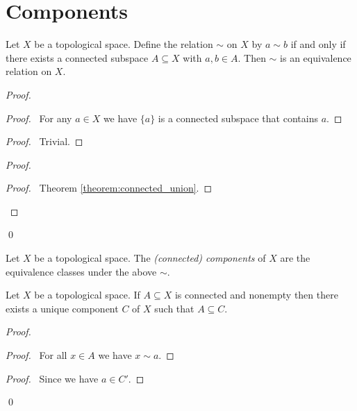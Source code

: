 \section{Components}

\begin{proposition}
    Let $X$ be a topological space. Define the relation $\sim$ on $X$ by
    $a \sim b$ if and only if there exists a connected subspace $A \subseteq X$
    with $a, b \in A$. Then $\sim$ is an equivalence relation on $X$.
\end{proposition}

\begin{proof}
    \pf
    \begin{proof}
        \pf\ For any $a \in X$ we have $\{a\}$ is a connected subspace that
        contains $a$.
    \end{proof}
    \begin{proof}
        \pf\ Trivial.
    \end{proof}
    \begin{proof}
        \begin{proof}
            \pf\ Theorem \ref{theorem:connected_union}.
        \end{proof}
    \end{proof}
    \qed
\end{proof}

\begin{definition}
    Let $X$ be a topological space. The \emph{(connected) components} of
    $X$ are the equivalence classes under the above $\sim$.
\end{definition}

\begin{lemma}
    \label{lemma:component_includes_connected}
    Let $X$ be a topological space. If $A \subseteq X$ is connected 
    and nonempty then there
    exists a unique component $C$ of $X$ such that $A \subseteq C$.
\end{lemma}

\begin{proof}
    \pf
    \begin{proof}
        \pf\ For all $x \in A$ we have $x \sim a$.
    \end{proof}
    \begin{proof}
        \pf\ Since we have $a \in C'$.
    \end{proof}
    \qed
\end{proof}

